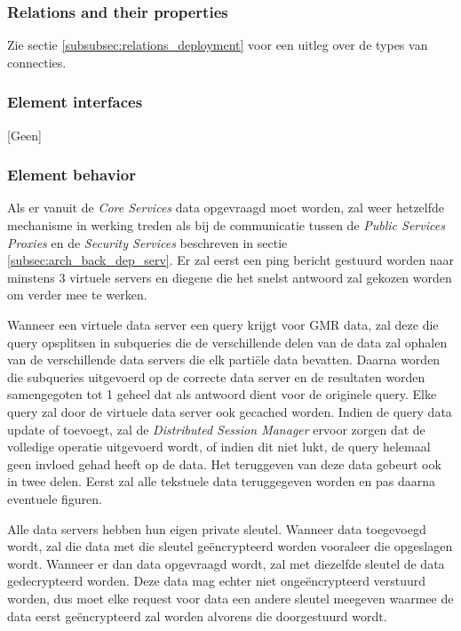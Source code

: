 \documentclass[a4paper,10pt]{article}
\begin{document}
\subsubsection*{Relations and their properties}
Zie sectie \ref{subsubsec:relations_deployment} voor een uitleg over de types van connecties.

\subsubsection*{Element interfaces}
[Geen]

\subsubsection*{Element behavior}
\label{subsubsec:dep_data_behavior}
Als er vanuit de \textit{Core Services} data opgevraagd moet worden, zal weer hetzelfde mechanisme in werking treden als bij de communicatie tussen de \textit{Public Services Proxies} en de \textit{Security Services} beschreven in sectie \ref{subsec:arch_back_dep_serv}. Er zal eerst een ping bericht gestuurd worden naar minstens 3 virtuele servers en diegene die het snelst antwoord zal gekozen worden om verder mee te werken.

Wanneer een virtuele data server een query krijgt voor GMR data, zal deze die query opsplitsen in subqueries die de verschillende delen van de data zal ophalen van de verschillende data servers die elk partiële data bevatten. Daarna worden die subqueries uitgevoerd op de correcte data server en de resultaten worden samengegoten tot 1 geheel dat als antwoord dient voor de originele query. Elke query zal door de virtuele data server ook gecached worden. Indien de query data update of toevoegt, zal de \textit{Distributed Session Manager} ervoor zorgen dat de volledige operatie uitgevoerd wordt, of indien dit niet lukt, de query helemaal geen invloed gehad heeft op de data. Het teruggeven van deze data gebeurt ook in twee delen. Eerst zal alle tekstuele data teruggegeven worden en pas daarna eventuele figuren.

Alle data servers hebben hun eigen private sleutel. Wanneer data toegevoegd wordt, zal die data met die sleutel geëncrypteerd worden vooraleer die opgeslagen wordt. Wanneer er dan data opgevraagd wordt, zal met diezelfde sleutel de data gedecrypteerd worden. Deze data mag echter niet ongeëncrypteerd verstuurd worden, dus moet elke request voor data een andere sleutel meegeven waarmee de data eerst geëncrypteerd zal worden alvorens die doorgestuurd wordt.
\end{document}
